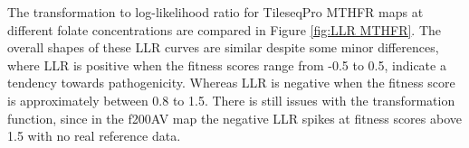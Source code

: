 \documentclass{article}
\begin{document}
The transformation to log-likelihood ratio for TileseqPro MTHFR maps at different folate concentrations are compared in Figure \ref{fig:LLR MTHFR}. The overall shapes of these LLR curves are similar despite some minor differences, where LLR is positive when the fitness scores range from -0.5 to 0.5, indicate a tendency towards pathogenicity. Whereas LLR is negative when the fitness score is approximately between 0.8 to 1.5. There is still issues with the transformation function, since in the f200AV map the negative LLR spikes at fitness scores above 1.5 with no real reference data. 

\begin{figure}[H]%
    \centering
    \qquad
    \qquad

\end{figure}
\end{document}
